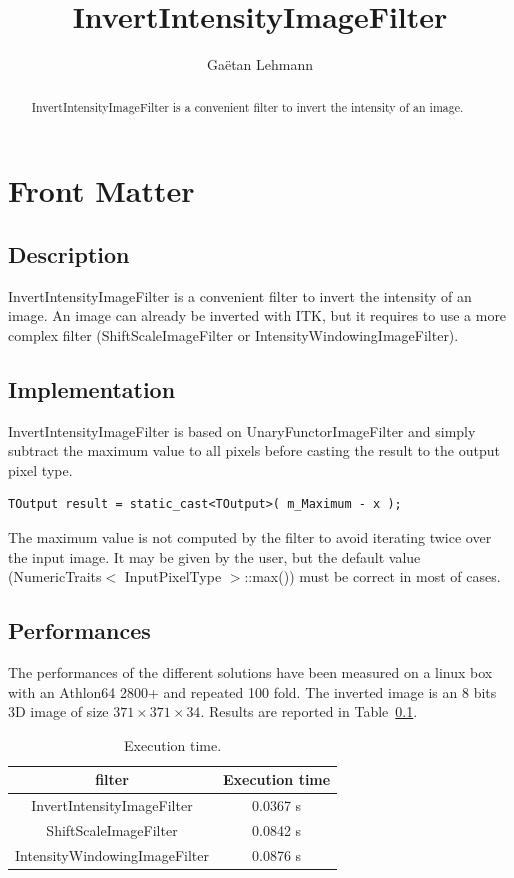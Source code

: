 \documentclass{InsightArticle}
\title{InvertIntensityImageFilter}
\author{Ga\"etan Lehmann}
\begin{document}
\lstset{language=c++}
\maketitle

\ifhtml
\chapter*{Front Matter\label{front}}
\fi

\begin{abstract}
\noindent
InvertIntensityImageFilter is a convenient filter to invert the intensity of an image.
\end{abstract}


\section{Description}
InvertIntensityImageFilter is a convenient filter to invert the intensity of an image. An image can already be inverted with ITK, but it requires to use a more complex filter (ShiftScaleImageFilter or IntensityWindowingImageFilter).

\section{Implementation}
InvertIntensityImageFilter is based on UnaryFunctorImageFilter and simply subtract the maximum value to all pixels before casting the result to the output pixel type.
\small \begin{verbatim}
TOutput result = static_cast<TOutput>( m_Maximum - x );
\end{verbatim} \normalsize
The maximum value is not computed by the filter to avoid iterating twice over the input image. It may be given by the user, but the default value (NumericTraits$<$ InputPixelType $>$::max()) must be correct in most of cases.
 
\section{Performances}
The performances of the different solutions have been measured on a linux box with an Athlon64 2800+ and repeated 100 fold. The inverted image is an 8 bits 3D image of size $371 \times 371 \times 34$. Results are reported in Table~\ref{perf}.

\begin{table}[htbp]
\centering
\begin{tabular}{cc}
\hline
filter & Execution time \\
\hline
\hline
InvertIntensityImageFilter & 0.0367 s \\
ShiftScaleImageFilter & 0.0842 s \\
IntensityWindowingImageFilter & 0.0876 s \\
\hline
\end{tabular}
\caption{Execution time.\label{perf}}
\end{table}
\end{document}
